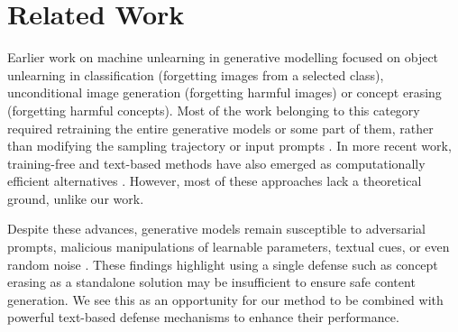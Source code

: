\section{Related Work}\label{sec:related}
%
%
%
%
%

Earlier work on machine unlearning in generative modelling focused on object unlearning in classification (forgetting images from a selected class), unconditional image generation (forgetting harmful images) or concept erasing (forgetting harmful concepts). Most of the work belonging to this category required retraining the entire generative models or some part of them, rather than modifying the sampling trajectory or input prompts \cite{heng2023selective, li2024machine, adapt_then_unlearn, zhang2024forgetmenot, gandikota2023unified, lu2024mace, gong2024reliable, lu2024mace}. 
In more recent work, training-free and text-based methods have also emerged as computationally efficient alternatives \cite{schramowski2023safe,yoon2024safree,ban2024understanding, armandpour2023reimagine}. 
However, most of these approaches lack a theoretical ground, unlike our work. 


%
%

%

%

%
%

%

%

%
%
%
%

 





%


Despite these advances, generative models remain susceptible to adversarial prompts, malicious manipulations of learnable parameters, textual cues, or even random noise \cite{pham2023circumventing, chin2024promptingdebugging, zhang2024generate, tsai2024ringabell}. These findings highlight using a single defense such as concept erasing as a standalone solution may be insufficient to ensure safe content generation. We see this as an opportunity for our method to be combined with powerful text-based defense mechanisms to enhance their performance.  



%

